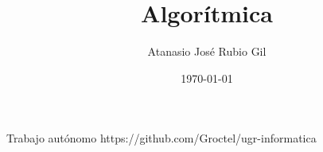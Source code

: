 \documentclass[10pt]{report}
\author{Atanasio José Rubio Gil}
\title{Algorítmica}
\date{\today}
\begin{document}
            {Trabajo autónomo}
            {https://github.com/Groctel/ugr-informatica}
\tableofcontents





\end{document}
